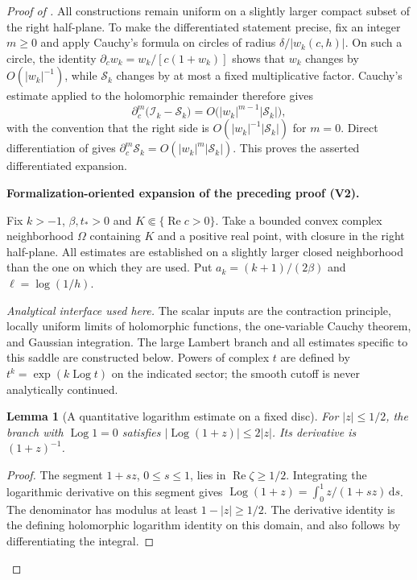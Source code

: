 \documentclass[11pt]{article}
\newtheorem{lemma}[theorem]{Lemma}
\newcommand{\formalisationparentid}{X}
\newenvironment{formalisationaddition}[1]{\par\medskip\begingroup\color{blue}\def\formalisationparentid{#1}\setcounter{formalizationsublemma}{0}\let\lemma\formalizationsublemma\let\endlemma\endformalizationsublemma
  \def\Eo{\mathcal E_h^\circ}\def\EE{\mathcal E_h}\def\phio{\phi_h^\circ}\def\phih{\phi_h}\def\Ho{H_h^{\rm atom}(v^\circ)}\def\Ha{H_h^{\rm atom}}\def\HL{H_h^{L}}\def\Dh{D_h}\def\Log{\operatorname{Log}}\def\ellh{\ell_h}\def\Gp{G_{p,h}}\def\Ast{A_{*,h}}\def\ahat{\widehat{\mathfrak a}_h}\def\ah{\mathfrak a_h}\def\rh{\widehat\rho_h}\def\deltah{\widehat\delta_h}\def\oldref##1{\textup{(##1)}}\def\interface##1{\par\noindent\textit{Analytical interface used here.} ##1\par}\def\finish{\par\noindent\textit{Conclusion of the formalization-oriented expansion.} }\par\noindent\textbf{Formalization-oriented expansion of the preceding proof (V2).}\par\smallskip
}{\par\endgroup\medskip
}
\newcommand{\Rea}{\operatorname{Re}}
\begin{document}
\begin{proof}[Proof of ]
All constructions remain uniform on a slightly larger compact subset of the
right half-plane.  To make the differentiated statement precise, fix an
integer $m\ge0$ and apply Cauchy's formula on circles of radius
$\delta/|w_k(c,h)|$.  On such a circle, the identity
$\partial_cw_k=w_k/[c(1+w_k)]$ shows that $w_k$ changes by $O(|w_k|^{-1})$,
while $\mathcal S_k$ changes by at most a fixed multiplicative factor.
Cauchy's estimate applied to the holomorphic remainder therefore gives
\[
 \partial_c^m\bigl(\mathcal I_k-\mathcal S_k\bigr)
 =O\bigl(|w_k|^{m-1}|\mathcal S_k|\bigr),
\]
with the convention that the right side is
$O(|w_k|^{-1}|\mathcal S_k|)$ for $m=0$.  Direct differentiation of
 gives
$\partial_c^m\mathcal S_k=O(|w_k|^m|\mathcal S_k|)$.
This proves the asserted differentiated expansion.

\begin{formalisationaddition}{D-T6.4}
Fix $k>-1$, $\beta,t_*>0$ and $K\Subset\{\Rea c>0\}$. Take a bounded
convex complex neighborhood $\Omega$ containing $K$ and a positive real
point, with closure in the right half-plane. All estimates are established
on a slightly larger closed neighborhood than the one on which they are
used. Put $a_k=(k+1)/(2\beta)$ and $\ell=\log(1/h)$.

\interface{The scalar inputs are the contraction principle, locally uniform
limits of holomorphic functions, the one-variable Cauchy theorem, and
Gaussian integration. The large Lambert branch and all estimates specific
to this saddle are constructed below. Powers of complex $t$ are defined
by $t^k=\exp(k\Log t)$ on the indicated sector; the smooth cutoff is
never analytically continued.}

\begin{lemma}[A quantitative logarithm estimate on a fixed disc]\label{sublemma:D6-4-log-disc}
For $|z|\le1/2$, the branch with $\Log1=0$ satisfies
$|\Log(1+z)|\le2|z|$. Its derivative is $(1+z)^{-1}$.
\end{lemma}
\begin{proof}
The segment $1+sz$, $0\le s\le1$, lies in $\Rea\zeta\ge1/2$.
Integrating the logarithmic derivative on this segment gives
$\Log(1+z)=\int_0^1 z/(1+sz)\,\mathrm ds$.
The denominator has modulus at least $1-|z|\ge1/2$.
The derivative identity is the defining holomorphic logarithm identity
on this domain, and also follows by differentiating the integral.
\end{proof}


\end{formalisationaddition}
\end{proof}
\end{document}
